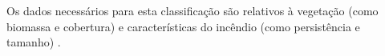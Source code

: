 Os dados necessários para esta classificação são relativos à vegetação (como biomassa e cobertura) e características do incêndio (como persistência e tamanho) \cite{gfed}.



   
